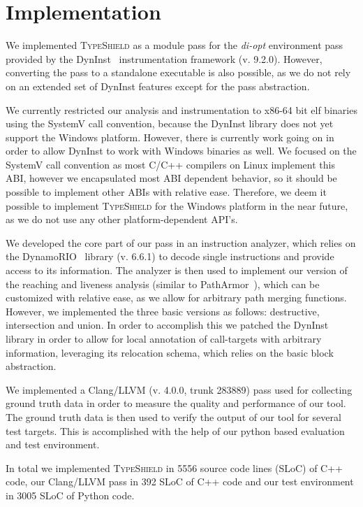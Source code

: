\section{Implementation}
\label{chapter:Implementation}

We implemented \textsc{TypeShield} as a module pass for the \textit{di-opt} environment pass provided by the 
DynInst~\cite{bernat:dyninst} instrumentation framework (v. 9.2.0). 
However, converting the pass to a standalone executable is also possible, as we do not rely on an extended set of DynInst features
except for the pass abstraction.

We currently restricted our analysis and instrumentation to x86-64 bit elf 
binaries using the SystemV call convention, because the DynInst library does not yet support the
Windows platform. However, there is currently work going on in order to allow DynInst to work with
Windows binaries as well. We focused on the SystemV call convention as most C/C++ compilers
on Linux implement this ABI, however we encapsulated most ABI dependent behavior, so it should 
be possible to implement other ABIs with relative ease. Therefore, we deem it possible to implement
\textsc{TypeShield} for the Windows platform in the near future, as we do not use any other 
platform-dependent API's. 

We developed the core part of our pass in an instruction analyzer, which relies on the DynamoRIO~\cite{dynamorio:drmemory} library 
(v. 6.6.1) to decode single instructions and provide access to its information. The analyzer is then
used to implement our version of the reaching and liveness analysis (similar to PathArmor~\cite{veen:typearmor}), which can
be customized with relative ease, as we allow for arbitrary path merging functions. However, we implemented 
the three basic versions as follows: destructive, intersection and union.
In order to accomplish this we patched the DynInst library in order to allow for local annotation of call-targets with arbitrary
information, leveraging its relocation schema, which relies on the basic block abstraction.

We implemented a Clang/LLVM (v. 4.0.0, trunk 283889) pass used for 
collecting ground truth data in order to measure the quality and performance of our tool. 
The ground truth data is then used to verify the output of our tool for several test targets. 
This is accomplished with the help of our python based evaluation and test environment.

In total we implemented \textsc{TypeShield} in 5556 source code lines (SLoC) of C++ code, our Clang/LLVM pass in 392 SLoC
of C++ code and our test environment in 3005 SLoC of Python code. 


